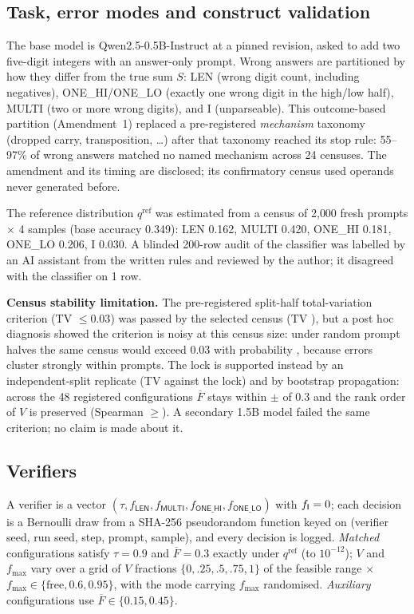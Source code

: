 \documentclass[11pt]{article}
\newcommand{\Fbar}{\overline{F}}
\newcommand{\fmax}{f_{\max}}
\newcommand{\qref}{q^{\mathrm{ref}}}
\begin{document}
\subsection{Task, error modes and construct validation}
The base model is Qwen2.5-0.5B-Instruct \citep{qwen2024qwen} at a pinned revision, asked to add two five-digit integers with an answer-only prompt.
Wrong answers are partitioned by how they differ from the true sum $S$: \textsf{LEN} (wrong digit count, including negatives), \textsf{ONE\_HI}/\textsf{ONE\_LO} (exactly one wrong digit in the high/low half), \textsf{MULTI} (two or more wrong digits), and \textsf{I} (unparseable).
This outcome-based partition (Amendment~1) replaced a pre-registered \emph{mechanism} taxonomy (dropped carry, transposition, \ldots) after that taxonomy reached its stop rule: 55--97\% of wrong answers matched no named mechanism across 24 censuses. The amendment and its timing are disclosed; its confirmatory census used operands never generated before.

The reference distribution $\qref$ was estimated from a census of 2{,}000 fresh prompts $\times$ 4 samples (base accuracy 0.349): \textsf{LEN} 0.162, \textsf{MULTI} 0.420, \textsf{ONE\_HI} 0.181, \textsf{ONE\_LO} 0.206, \textsf{I} 0.030.
A blinded 200-row audit of the classifier was labelled by an AI assistant from the written rules and reviewed by the author; it disagreed with the classifier on 1 row.

\textbf{Census stability limitation.} The pre-registered split-half total-variation criterion (TV $\le0.03$) was passed by the selected census (TV \TVdeclared), but a post hoc diagnosis showed the criterion is noisy at this census size: under random prompt halves the same census would exceed 0.03 with probability \TVpfail, because errors cluster strongly within prompts. The lock is supported instead by an independent-split replicate (TV \TVreplicate{} against the lock) and by bootstrap propagation: across the 48 registered configurations $\Fbar$ stays within $\pm$\FbarDev{} of 0.3 and the rank order of $V$ is preserved (Spearman $\ge$\VrankMin). A secondary 1.5B model failed the same criterion; no claim is made about it.

\subsection{Verifiers}
A verifier is a vector $(\tau,f_{\textsf{LEN}},f_{\textsf{MULTI}},f_{\textsf{ONE\_HI}},f_{\textsf{ONE\_LO}})$ with $f_{\textsf I}=0$; each decision is a Bernoulli draw from a SHA-256 pseudorandom function keyed on (verifier seed, run seed, step, prompt, sample), and every decision is logged.
\emph{Matched} configurations satisfy $\tau=0.9$ and $\Fbar=0.3$ exactly under $\qref$ (to $10^{-12}$); $V$ and $\fmax$ vary over a grid of $V$ fractions $\{0,.25,.5,.75,1\}$ of the feasible range $\times$ $\fmax\in\{\text{free},0.6,0.95\}$, with the mode carrying $\fmax$ randomised. \emph{Auxiliary} configurations use $\Fbar\in\{0.15,0.45\}$.
\end{document}
